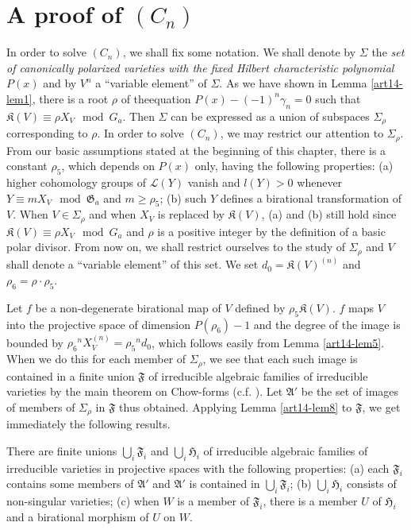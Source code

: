 \section{A proof of \texorpdfstring{$(C_{n})$}{Cn}}\label{art14-sec9}

In order to solve $(C_{n})$, we shall fix some notation. We shall denote by $\Sigma$ the {\em set of canonically polarized varieties with the fixed Hilbert characteristic polynomial} $P(x)$ and by $V^{n}$ a ``variable element'' of $\Sigma$. As we have shown in Lemma \ref{art14-lem1}, there is a root $\rho$ of the\pageoriginale equation $P(x)-(-1)^{n}\gamma_{n}=0$ such that $\mathfrak{K}(V)\equiv \rho X_{V}\mod G_{a}$. Then $\Sigma$ can be expressed as a union of subspaces $\Sigma_{\rho}$ corresponding to $\rho$. In order to solve $(C_{n})$, we may restrict our attention to $\Sigma_{\rho}$. From our basic assumptions stated at the beginning of this chapter, there is a constant $\rho_{5}$, which depends on $P(x)$ only, having the following properties: (a) higher cohomology groups of $\mathscr{L}(Y)$ vanish and $l(Y)>0$ whenever $Y\equiv mX_{V}\mod \mathfrak{G}_{a}$ and $m\geq \rho_{5}$; (b) such $Y$ defines a birational transformation of $V$. When $V\in \Sigma_{\rho}$ and when $X_{V}$ is replaced by $\mathfrak{K}(V)$, (a) and (b) still hold since $\mathfrak{K}(V)\equiv\rho X_{V}\mod G_{a}$ and $\rho$ is a positive integer by the definition of a basic polar divisor. From now on, we shall restrict ourselves to the study of $\Sigma_{\rho}$ and $V$ shall denote a ``variable element'' of this set. We set $d_{0}=\mathfrak{K}(V)^{(n)}$ and $\rho_{6}=\rho\cdot \rho_{5}$.

Let $f$ be a non-degenerate birational map of $V$ defined by $\rho_{5}\mathfrak{K}(V)$. $f$ maps $V$ into the projective space of dimension $P(\rho_{6})-1$ and the degree of the image is bounded by $\rho_{6}{}^{n}X_{V}^{(n)}=\rho_{5}{}^{n}d_{0}$, which follows easily from Lemma \ref{art14-lem5}. When we do this for each member of $\Sigma_{\rho}$, we see that each such image is contained in a finite union $\mathfrak{F}$ of irreducible algebraic families of irreducible varieties by the main theorem on Chow-forms (c.f. \cite{art14-key3}). Let $\mathfrak{A}'$ be the set of images of members of $\Sigma_{\rho}$ in $\mathfrak{F}$ thus obtained. Applying Lemma \ref{art14-lem8} to $\mathfrak{F}$, we get immediately the following results.

\begin{lemma}\label{art14-lem15}
There are finite unions $\bigcup_{i}\mathfrak{F}_{i}$ and $\bigcup_{i}\mathfrak{H}_{i}$ of irreducible algebraic families of irreducible varieties in projective spaces with the following properties: {\rm(a)} each $\mathfrak{F}_{i}$ contains some members of $\mathfrak{A}'$ and $\mathfrak{A}'$ is contained in $\bigcup_{i}\mathfrak{F}_{i}$; {\rm(b)} $\bigcup_{i}\mathfrak{H}_{i}$ consists of non-singular varieties; {\rm(c)} when $W$ is a member of $\mathfrak{F}_{i}$, there is a member $U$ of $\mathfrak{H}_{i}$ and a birational morphism of $U$ on $W$.
\end{lemma}


